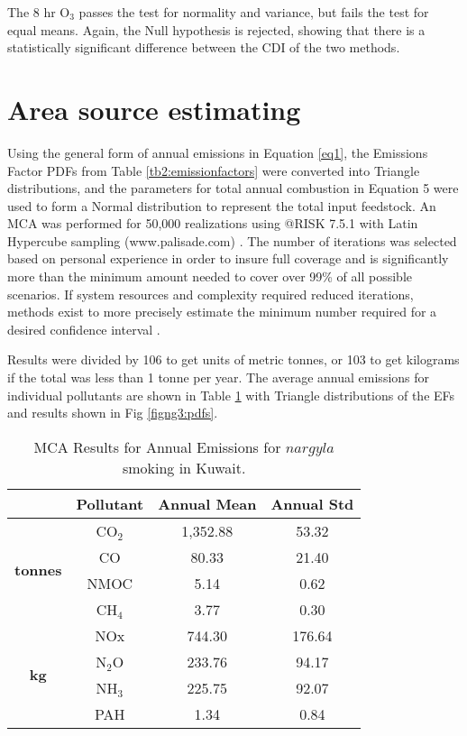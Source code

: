 The 8 hr O$_{3}$ passes the test for normality and variance, but fails the test for equal means. Again, the Null hypothesis is rejected, showing that there is a statistically significant difference between the CDI of the two methods.
\clearpage

\section{Area source estimating}

Using the general form of annual emissions in Equation \ref{eq1}, the Emissions Factor PDFs from Table \ref{tb2:emissionfactors} were converted into Triangle distributions, and the parameters for total annual combustion in Equation 5 were used to form a Normal distribution to represent the total input feedstock.  An MCA was performed for 50,000 realizations using @RISK 7.5.1 with Latin Hypercube sampling (www.palisade.com) . The number of iterations was selected based on personal experience  in order to insure full coverage and is significantly more than the minimum amount needed to cover over 99\% of all possible scenarios.  If system resources and complexity required reduced iterations, methods exist to more precisely estimate the minimum number required for a desired confidence interval \citep{Bukaci2016}.

Results were divided by 106 to get units of metric tonnes, or 103 to get kilograms if the total was less than 1 tonne per year.  The average annual emissions for individual pollutants are shown in Table \ref{tb4:results} with Triangle distributions of the EFs and results shown in Fig \ref{figng3:pdfs}. 

%
\begin{table}[!htb]
\centering
\caption{MCA Results for Annual Emissions for $nargyla$ smoking in Kuwait.}
\label{tb4:results}
\begin{tabular}{@{}cccc@{}}
\toprule
 & \textbf{Pollutant} & \textbf{Annual Mean} & \textbf{Annual Std} \\ \midrule
\multirow{4}{*}{\textbf{tonnes}} & CO$_{2}$ & 1,352.88 & 53.32 \\
 & CO & 80.33 & 21.40 \\
 & NMOC & 5.14 & 0.62 \\
 & CH$_{4}$ & 3.77 & 0.30 \\ \midrule
\multirow{4}{*}{\textbf{kg}} & NOx & 744.30 & 176.64 \\
 & N$_{2}$O & 233.76 & 94.17 \\
 & NH$_{3}$ & 225.75 & 92.07 \\
 & PAH & 1.34 & 0.84 \\ \bottomrule 
\end{tabular}
\end{table}
% 
 
